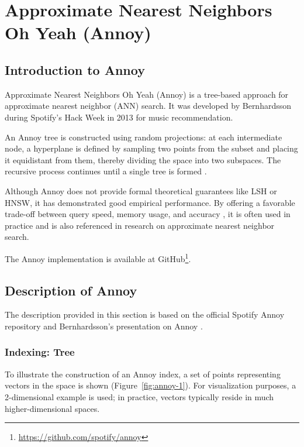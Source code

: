 \section{Approximate Nearest Neighbors Oh Yeah (Annoy)}

\subsection{Introduction to Annoy}

Approximate Nearest Neighbors Oh Yeah (Annoy) is a tree-based approach for approximate nearest neighbor (ANN) search. It was developed by Bernhardsson during Spotify's Hack Week in 2013 \cite{spotify-annoy} for music recommendation.

An Annoy tree is constructed using random projections: at each intermediate node, a hyperplane is defined by sampling two points from the subset and placing it equidistant from them, thereby dividing the space into two subspaces. The recursive process continues until a single tree is formed \cite{spotify-annoy}.

Although Annoy does not provide formal theoretical guarantees like LSH or HNSW, it has demonstrated good empirical performance. By offering a favorable trade-off between query speed, memory usage, and accuracy \cite{Li-Zhang-Sun-Wang-Zhang-Lin-2016}, it is often used in practice and is also referenced in research on approximate nearest neighbor search.

The Annoy implementation is available at GitHub\footnote{\url{https://github.com/spotify/annoy}}.

\subsection{Description of Annoy}

The description provided in this section is based on the official Spotify Annoy repository \cite{spotify-annoy} and Bernhardsson's presentation on Annoy \cite{erikbern-ann-presentation}.

\subsubsection{Indexing: Tree}

\noindent
To illustrate the construction of an Annoy index, a set of points representing vectors in the space is shown (Figure~\ref{fig:annoy-1}). For visualization purposes, a 2-dimensional example is used; in practice, vectors typically reside in much higher-dimensional spaces.

